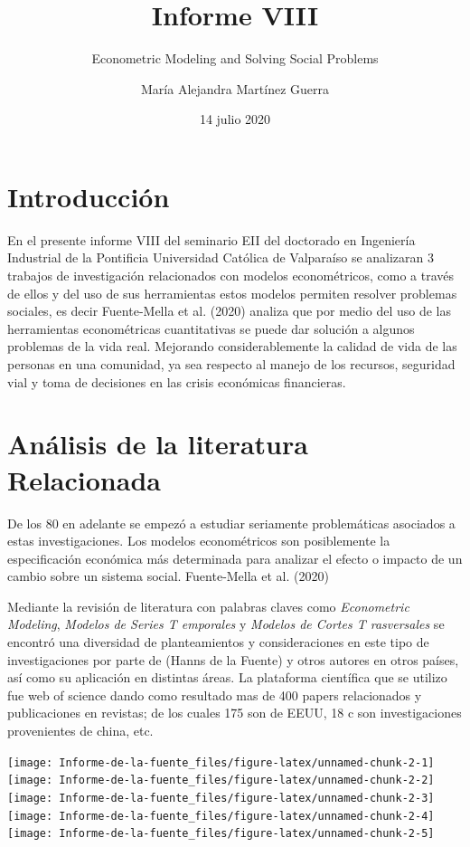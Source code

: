 \documentclass[
  british,
]{article}
\title{Informe VIII}
\subtitle{Econometric Modeling and Solving Social Problems}
\author{María Alejandra Martínez Guerra}
\date{14 julio 2020}
\begin{document}
\maketitle

\hypertarget{introducciuxf3n}{%
\section{Introducción}\label{introducciuxf3n}}

En el presente informe VIII del seminario EII del doctorado en
Ingeniería Industrial de la Pontificia Universidad Católica de
Valparaíso se analizaran 3 trabajos de investigación relacionados con
modelos econométricos, como a través de ellos y del uso de sus
herramientas estos modelos permiten resolver problemas sociales, es
decir Fuente-Mella et al. (2020) analiza que por medio del uso de las
herramientas econométricas cuantitativas se puede dar solución a algunos
problemas de la vida real. Mejorando considerablemente la calidad de
vida de las personas en una comunidad, ya sea respecto al manejo de los
recursos, seguridad vial y toma de decisiones en las crisis económicas
financieras.

\hypertarget{anuxe1lisis-de-la-literatura-relacionada}{%
\section{Análisis de la literatura
Relacionada}\label{anuxe1lisis-de-la-literatura-relacionada}}

De los 80 en adelante se empezó a estudiar seriamente problemáticas
asociados a estas investigaciones. Los modelos econométricos son
posiblemente la especificación económica más determinada para analizar
el efecto o impacto de un cambio sobre un sistema social. Fuente-Mella
et al. (2020)

Mediante la revisión de literatura con palabras claves como
\emph{Econometric Modeling}, \emph{Modelos de Series T emporales} y
\emph{Modelos de Cortes T rasversales} se encontró una diversidad de
planteamientos y consideraciones en este tipo de investigaciones por
parte de (Hanns de la Fuente) y otros autores en otros países, así como
su aplicación en distintas áreas. La plataforma científica que se
utilizo fue web of science dando como resultado mas de 400 papers
relacionados y publicaciones en revistas; de los cuales 175 son de EEUU,
18 c son investigaciones provenientes de china, etc.

\texttt{[image: Informe-de-la-fuente\_files/figure-latex/unnamed-chunk-2-1]}
\texttt{[image: Informe-de-la-fuente\_files/figure-latex/unnamed-chunk-2-2]}
\texttt{[image: Informe-de-la-fuente\_files/figure-latex/unnamed-chunk-2-3]}
\texttt{[image: Informe-de-la-fuente\_files/figure-latex/unnamed-chunk-2-4]}
\texttt{[image: Informe-de-la-fuente\_files/figure-latex/unnamed-chunk-2-5]}
\end{document}
